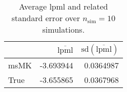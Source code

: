 \begin{table}[H]

\caption{Average lpml and related standard error over $n_{\text{sim}} = 10$ simulations.}
\centering
\begin{tabular}[t]{lrr}
\toprule
  & $\overbar{\text{lpml}}$ & $\text{sd}(\overbar{\text{lpml}})$\\
\midrule
msMK & -3.693944 & 0.0364987\\
True & -3.655865 & 0.0367968\\
\bottomrule
\end{tabular}
\end{table}